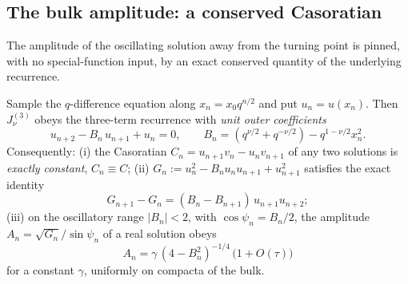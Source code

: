 \subsection{The bulk amplitude: a conserved Casoratian}
The amplitude of the oscillating solution away from the turning point is pinned, with no
special-function input, by an exact conserved quantity of the underlying recurrence.

\begin{lemma}\label{lem:caso}
Sample the $q$-difference equation along $x_n=x_0q^{n/2}$ and put $u_n=u(x_n)$. Then
$J^{(3)}_\nu$ obeys the three-term recurrence with \emph{unit outer coefficients}
\begin{equation}\label{eq:rec}
   u_{n+2}-B_n\,u_{n+1}+u_n=0,\qquad
   B_n=(q^{\nu/2}+q^{-\nu/2})-q^{1-\nu/2}x_n^2 .
\end{equation}
Consequently:
\textnormal{(i)} the Casoratian $C_n=u_{n+1}v_n-u_nv_{n+1}$ of any two solutions is
\emph{exactly constant}, $C_n\equiv C$;
\textnormal{(ii)} $G_n:=u_n^2-B_nu_nu_{n+1}+u_{n+1}^2$ satisfies the exact identity
\begin{equation}\label{eq:Gid}
   G_{n+1}-G_n=(B_n-B_{n+1})\,u_{n+1}u_{n+2};
\end{equation}
\textnormal{(iii)} on the oscillatory range $|B_n|<2$, with $\cos\psi_n=B_n/2$, the amplitude
$A_n=\sqrt{G_n}/\sin\psi_n$ of a real solution obeys
\begin{equation}\label{eq:env}
   A_n=\gamma\,(4-B_n^2)^{-1/4}\,\big(1+O(\tau)\big)
\end{equation}
for a constant $\gamma$, uniformly on compacta of the bulk.
\end{lemma}

